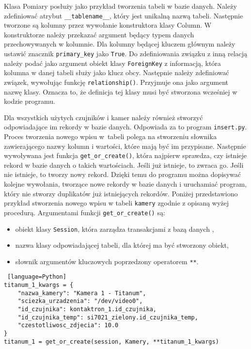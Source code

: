 \documentclass[a4paper,11pt,twoside]{article}
\begin{document}
Klasa Pomiary posłuży jako przykład tworzenia tabeli w bazie danych. Należy zdefiniować atrybut \texttt{{\_\_}tablename{\_\_}}, który jest unikalną nazwą tabeli. Następnie tworzone są kolumny przez wywołanie konstruktora klasy Column. W konstruktorze należy przekazać argument będący typem danych przechowywanych w kolumnie. Dla kolumny będącej kluczem głównym należy ustawić znacznik \texttt{primary{\_}key} jako \texttt{True}. Do zdefiniowania związku z inną relacją należy podać jako argument obiekt klasy \texttt{ForeignKey} z informacją, która kolumna w danej tabeli służy jako klucz obcy. Następnie należy zdefiniować związek, wywołując funkcję \texttt{relationship()}. Przyjmuje ona jako argument nazwę klasy. Oznacza to, że definicja tej klasy musi być stworzona wcześniej w kodzie programu.

Dla wszystkich użytych czujników i kamer należy również stworzyć odpowiadające im rekordy w bazie danych. Odpowiada za to program \texttt{insert.py}. Proces tworzenia nowego wpisu w~tabeli polega na stworzeniu słownika zawierającego nazwy kolumn i wartości, które mają być im przypisane. Następnie wywoływana jest funkcja \texttt{get{\_}or{\_}create()}, która najpierw sprawdza, czy istnieje rekord w bazie danych o takich wartościach. Jeśli już istnieje, to zwraca go. Jeśli nie istnieje, to tworzy nowy rekord. Dzięki temu do programu można dopisywać kolejne wywołania, tworzące nowe rekordy w bazie danych i uruchamiać program, który nie stworzy duplikatów już istniejących rekordów. Poniżej przedstawiono przykład stworzenia nowego wpisu w tabeli \texttt{kamery} zgodnie z opisaną wyżej procedurą. Argumentami funkcji \texttt{get{\_}or{\_}create()} są:
\begin{itemize}
\item obiekt klasy \texttt{Session}, która zarządza transakcjami z bazą danych \cite{sqlalchemy-session},
\item nazwa klasy odpowiadającej tabeli, dla której ma być stworzony obiekt,
\item słownik argumentów kluczowych poprzedzony operatorem \texttt{**}.
\end{itemize}
\begin{lstlisting} [language=Python]
titanum_1_kwargs = {
    "nazwa_kamery": "Kamera 1 - Titanum",
    "sciezka_urzadzenia": "/dev/video0",
    "id_czujnika": kontaktron_1.id_czujnika,
    "id_czujnika_temp": si7021_zielony.id_czujnika_temp,
    "czestotliwosc_zdjecia": 10.0
}
titanum_1 = get_or_create(session, Kamery, **titanum_1_kwargs)
\end{lstlisting}
\end{document}
